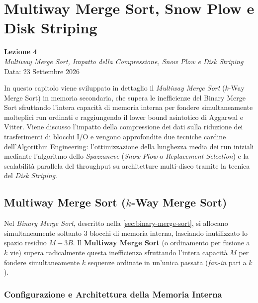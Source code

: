 \chapter{Multiway Merge Sort, Snow Plow e Disk Striping}
\label{cha:lecture-four}

\begin{center}
  \textbf{Lezione 4}\\
  \emph{Multiway Merge Sort, Impatto della Compressione, Snow Plow e Disk Striping}\\[0.5em]
  Data: 23 Settembre 2026
\end{center}

In questo capitolo viene sviluppato in dettaglio il \textit{Multiway Merge Sort} ($k$-Way Merge Sort) in memoria secondaria, che supera le inefficienze del Binary Merge Sort sfruttando l'intera capacità di memoria interna per fondere simultaneamente molteplici run ordinati e raggiungendo il lower bound asintotico di Aggarwal e Vitter. Viene discusso l'impatto della compressione dei dati sulla riduzione dei trasferimenti di blocchi I/O e vengono approfondite due tecniche cardine dell'Algorithm Engineering: l'ottimizzazione della lunghezza media dei run iniziali mediante l'algoritmo dello \textit{Spazzaneve} (\textit{Snow Plow} o \textit{Replacement Selection}) e la scalabilità parallela del throughput su architetture multi-disco tramite la tecnica del \textit{Disk Striping}.

\section{Multiway Merge Sort (\texorpdfstring{$k$}{k}-Way Merge Sort)}
\label{sec:multiway-merge-sort}

Nel \textit{Binary Merge Sort}, descritto nella \autoref{sec:binary-merge-sort}, si allocano simultaneamente soltanto 3 blocchi di memoria interna, lasciando inutilizzato lo spazio residuo $M - 3B$. Il \textbf{Multiway Merge Sort} (o ordinamento per fusione a $k$ vie) supera radicalmente questa inefficienza sfruttando l'intera capacità $M$ per fondere simultaneamente $k$ sequenze ordinate in un'unica passata (\textit{fan-in} pari a $k$).

\subsection{Configurazione e Architettura della Memoria Interna}
\label{subsec:multiway-memory-layout}

